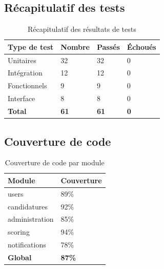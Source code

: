 \subsection{Récapitulatif des tests}
\begin{table}[htbp]
\centering
\caption{Récapitulatif des résultats de tests}
\label{tab:recap-tests}
\begin{tabular}{p{4cm} p{2cm} p{2cm} p{2cm}}
\toprule
\textbf{Type de test} & \textbf{Nombre} & \textbf{Passés} & \textbf{Échoués} \\
\midrule
Unitaires & 32 & 32 & 0 \\
Intégration & 12 & 12 & 0 \\
Fonctionnels & 9 & 9 & 0 \\
Interface & 8 & 8 & 0 \\
\midrule
\textbf{Total} & \textbf{61} & \textbf{61} & \textbf{0} \\
\bottomrule
\end{tabular}
\end{table}

\subsection{Couverture de code}
\begin{table}[htbp]
\centering
\caption{Couverture de code par module}
\label{tab:couverture}
\begin{tabular}{p{4cm} p{3cm}}
\toprule
\textbf{Module} & \textbf{Couverture} \\
\midrule
users & 89\% \\
candidatures & 92\% \\
administration & 85\% \\
scoring & 94\% \\
notifications & 78\% \\
\midrule
\textbf{Global} & \textbf{87\%} \\
\bottomrule
\end{tabular}
\end{table}

